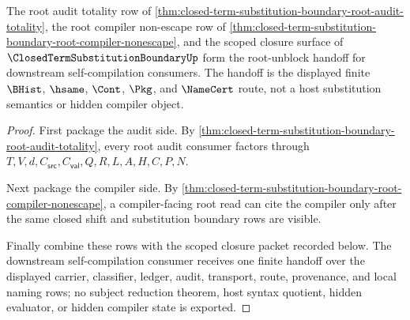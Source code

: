 \begin{theorem}
\label{thm:closed-term-substitution-boundary-root-namecert-handoff}
The root audit totality row of \autoref{thm:closed-term-substitution-boundary-root-audit-totality}, the root compiler non-escape row of \autoref{thm:closed-term-substitution-boundary-root-compiler-nonescape}, and the scoped closure surface of $\ClosedTermSubstitutionBoundaryUp$ form the root-unblock handoff for downstream self-compilation consumers. The handoff is the displayed finite $\BHist$, $\hsame$, $\Cont$, $\Pkg$, and $\NameCert$ route, not a host substitution semantics or hidden compiler object.
\end{theorem}
\begin{proof}
First package the audit side. By \autoref{thm:closed-term-substitution-boundary-root-audit-totality}, every root audit consumer factors through $T,V,d,C_{\mathsf{src}},C_{\mathsf{val}},Q,R,L,A,H,C,P,N$.

Next package the compiler side. By \autoref{thm:closed-term-substitution-boundary-root-compiler-nonescape}, a compiler-facing root read can cite the compiler only after the same closed shift and substitution boundary rows are visible.

Finally combine these rows with the scoped closure packet recorded below. The downstream self-compilation consumer receives one finite handoff over the displayed carrier, classifier, ledger, audit, transport, route, provenance, and local naming rows; no subject reduction theorem, host syntax quotient, hidden evaluator, or hidden compiler state is exported.
\end{proof}

